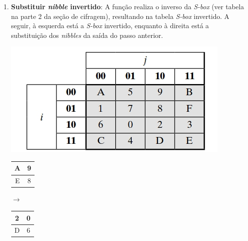 \documentclass{article}
\begin{document}
\begin{enumerate}
    \item \textbf{Substituir \textit{nibble} invertido}: A função realiza o
    inverso da \textit{S-box} (ver tabela na parte 2 da seção de cifragem),
    resultando na tabela \textit{S-box} invertido. A seguir, à esquerda está a
    \textit{S-box} invertido, enquanto à direita está a substituição dos
    \textit{nibbles} da saída do passo anterior.

    \begin{minipage}{0.32\textwidth}
        \includegraphics[width=\linewidth]{imgs/inverse_s-box.jpg}
    \end{minipage}
    \begin{minipage}{0.6\textwidth}
        \begin{tabular}{|c|c|}
            \hline
            A & 9  \\
            \hline
            E & 8 \\
            \hline
        \end{tabular}
        $\to$
        \begin{tabular}{|c|c|}
            \hline
            2 & 0 \\
            \hline
            D & 6 \\
            \hline
        \end{tabular}
    \end{minipage}
    

\end{enumerate}
\end{document}
